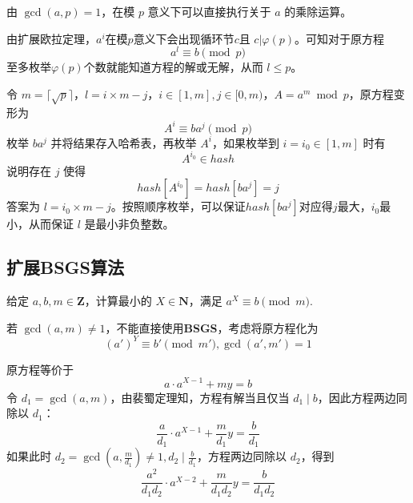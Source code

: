 \documentclass[12pt,a4paper]{article}
\begin{document}
由 $\gcd(a,p)=1$，在模 $p$ 意义下可以直接执行关于 $a$ 的乘除运算。

由扩展欧拉定理，$a^i$在模$p$意义下会出现循环节$c$且 $c|\varphi(p)$。可知对于原方程 \begin{equation*}
	a^l \equiv b \pmod p
\end{equation*}
至多枚举$\varphi(p)$个数就能知道方程的解或无解，从而 $l\leq p$。

令 $m=\lceil\sqrt{p}\rceil$，$l=i\times m-j$，$i\in[1,m],j\in[0,m)$，$A=a^m\bmod{p}$，原方程变形为 \begin{equation*}
	A^i\equiv ba^j\pmod{p}
\end{equation*}
枚举 $ba^j$ 并将结果存入哈希表，再枚举 $A^i$，如果枚举到 $i=i_0\in [1,m]$ 时有 
\begin{equation*}
	A^{i_0}\in hash
\end{equation*}
说明存在 $j$ 使得 \begin{equation*}
	hash[A^{i_0}]=hash[ba^j]=j
\end{equation*}
答案为 $l=i_0\times m-j$。按照顺序枚举，可以保证$hash[ba^j]$对应得$j$最大，$i_0$最小，从而保证 $l$ 是最小非负整数。

\subsection{扩展BSGS算法}
\begin{mdframed}[leftline=true, linewidth=2pt, linecolor=gray]
	给定 $a,b,m\in \mathbf{Z}$，计算最小的 $X\in\mathbf{N}$，满足 $a^X \equiv b \pmod m$.
\end{mdframed}

若 $\gcd(a,m)\ne1$，不能直接使用\textbf{BSGS}，考虑将原方程化为\begin{equation*}
	(a')^{Y}\equiv b'\pmod{m'},\gcd(a',m')=1
\end{equation*}

原方程等价于
\begin{equation*}
	a\cdot a^{X-1}+my=b
\end{equation*}
令 $d_1=\gcd(a,m)$，由裴蜀定理知，方程有解当且仅当 $d_1\mid b$，因此方程两边同除以 $d_1$：
\begin{equation*}
	\displaystyle\frac{a}{d_1}\cdot a^{X-1}+\frac{m}{d_1}y=\frac{b}{d_1}
\end{equation*}
如果此时 $\displaystyle d_2=\gcd(a,\frac{m}{d_1})\neq 1, d_2\mid\frac{b}{d_1}$，方程两边同除以 $d_2$，得到 \begin{equation*}
	\displaystyle\frac{a^2}{d_1d_2}\cdot a^{X-2}+\frac{m}{d_1d_2}y=\frac{b}{d_1d_2}
\end{equation*}
\end{document}
